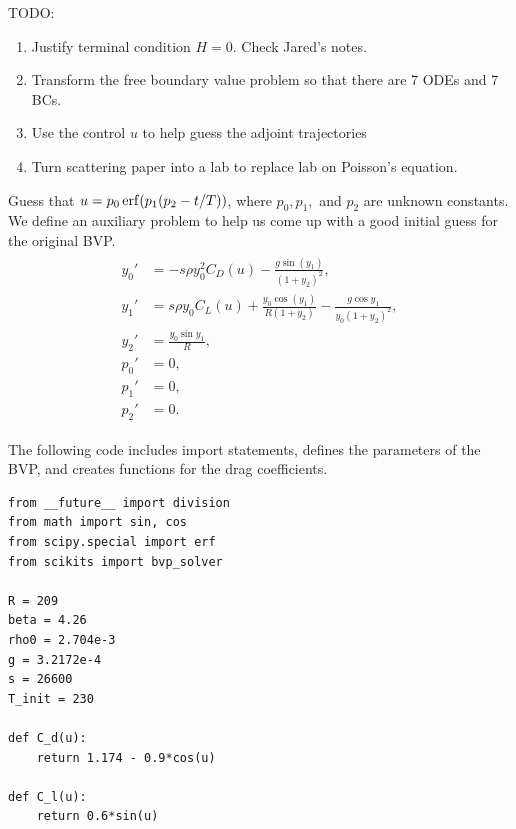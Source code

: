 TODO: 
\begin{enumerate}
	\item Justify terminal condition $H = 0$. Check Jared's notes.
	\item Transform the free boundary value problem so that there are 7 ODEs and 7 BCs. 
	\item Use the control $u$ to help guess the adjoint trajectories
	\item Turn scattering paper into a lab to replace lab on Poisson's equation. 
	
\end{enumerate}
Guess that $u = p_0\operatorname{erf}(p_1(p_2-t/T))$, where $p_0, p_1,$ and $p_2$ are unknown constants. 
We define an auxiliary problem to help us come up with a good initial guess for the original BVP. 
\begin{align}
\begin{split}
y_0' &= -s\rho y_0^2C_D(u) - \frac{g\sin(y_1)}{(1+y_2)^2},\\
y_1' &= s \rho y_0 C_L(u) + \frac{y_0 \cos(y_1)}{R(1+y_2)} - \frac{g \cos y_1}{y_0(1+y_2)^2},\\
y_2' &= \frac{y_0 \sin y_1}{R} ,\\
p_0' &= 0, \\
p_1' &= 0, \\
p_2' &= 0.
\end{split} \label{eqn:reentry:control_system_auxiliary}
\end{align}



The following code includes import statements, defines the parameters of the BVP, and creates functions for the drag coefficients. 
\begin{lstlisting}
from __future__ import division
from math import sin, cos
from scipy.special import erf
from scikits import bvp_solver 

R = 209
beta = 4.26
rho0 = 2.704e-3
g = 3.2172e-4
s = 26600	
T_init = 230

def C_d(u): 
	return 1.174 - 0.9*cos(u)

def C_l(u): 
	return 0.6*sin(u)
	
\end{lstlisting}

